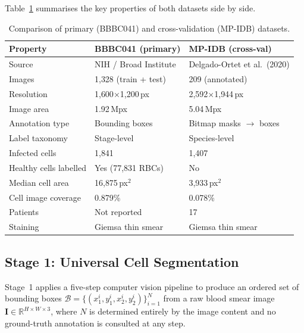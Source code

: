 \documentclass[review,12pt]{elsarticle}
\begin{document}
Table~\ref{tab:dataset_comparison} summarises the key properties of both
datasets side by side.

\begin{table}[H]
\centering
\small
\caption{Comparison of primary (BBBC041) and cross-validation (MP-IDB) datasets.}
\label{tab:dataset_comparison}
\renewcommand{\arraystretch}{1.15}
\begin{tabular}{lll}
\toprule
\textbf{Property} & \textbf{BBBC041 (primary)} & \textbf{MP-IDB (cross-val)} \\
\midrule
Source              & NIH / Broad Institute     & Delgado-Ortet et al.\ (2020) \\
Images              & 1{,}328 (train + test)    & 209 (annotated) \\
Resolution          & 1{,}600$\times$1{,}200\,px  & 2{,}592$\times$1{,}944\,px \\
Image area          & 1.92\,Mpx                 & 5.04\,Mpx \\
Annotation type     & Bounding boxes            & Bitmap masks $\rightarrow$ boxes \\
Label taxonomy      & Stage-level               & Species-level \\
Infected cells      & 1{,}841                   & 1{,}407 \\
Healthy cells labelled & Yes (77{,}831 RBCs)   & No \\
Median cell area    & 16{,}875\,px$^2$          & 3{,}933\,px$^2$ \\
Cell image coverage & 0.879\%                   & 0.078\% \\
Patients            & Not reported              & 17 \\
Staining            & Giemsa thin smear         & Giemsa thin smear \\
\bottomrule
\end{tabular}
\end{table}

\subsection{Stage 1: Universal Cell Segmentation}
\label{ssec:stage1}

Stage~1 applies a five-step computer vision pipeline to produce an ordered
set of bounding boxes $\mathcal{B} = \{(x_1^i, y_1^i, x_2^i, y_2^i)\}_{i=1}^N$
from a raw blood smear image $\mathbf{I} \in \mathbb{R}^{H \times W \times 3}$,
where $N$ is determined entirely by the image content and no ground-truth
annotation is consulted at any step.
\end{document}
